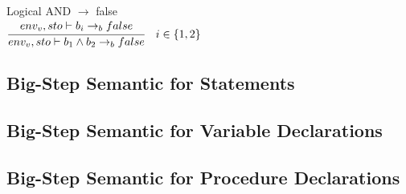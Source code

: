 Logical AND $\rightarrow$ false\\
\begin{math}
	\cfrac{env_v, sto \vdash b_i \rightarrow_b false}{env_v, sto \vdash b_1 \wedge b_2 \rightarrow_b false} \quad i \in \{1,2\}
\end{math}

\subsection{Big-Step Semantic for Statements}

\subsection{Big-Step Semantic for Variable Declarations}

\subsection{Big-Step Semantic for Procedure Declarations}

